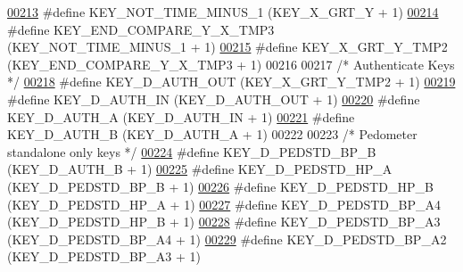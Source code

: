 \begin{DoxyCode}
\hypertarget{dmp_key_8h_source.tex_l00213}{}\hyperlink{dmp_key_8h_ab1bf47800a1876cde2b38ed43380180e}{00213} \textcolor{preprocessor}{#define KEY\_NOT\_TIME\_MINUS\_1        (KEY\_X\_GRT\_Y + 1)}
\hypertarget{dmp_key_8h_source.tex_l00214}{}\hyperlink{dmp_key_8h_a7e19d54f40e69e66c4c6f5d07bd9a3ff}{00214} \textcolor{preprocessor}{#define KEY\_END\_COMPARE\_Y\_X\_TMP3    (KEY\_NOT\_TIME\_MINUS\_1 + 1)}
\hypertarget{dmp_key_8h_source.tex_l00215}{}\hyperlink{dmp_key_8h_a4a328a8ff13b50c160f74d3c2598d329}{00215} \textcolor{preprocessor}{#define KEY\_X\_GRT\_Y\_TMP2            (KEY\_END\_COMPARE\_Y\_X\_TMP3 + 1)}
00216 
00217 \textcolor{comment}{/* Authenticate Keys */}
\hypertarget{dmp_key_8h_source.tex_l00218}{}\hyperlink{dmp_key_8h_a4c29ca8efec08f8a64600e8aa5a32c12}{00218} \textcolor{preprocessor}{#define KEY\_D\_AUTH\_OUT              (KEY\_X\_GRT\_Y\_TMP2 + 1)}
\hypertarget{dmp_key_8h_source.tex_l00219}{}\hyperlink{dmp_key_8h_a59e847b64e33e61f9966b3d983b10b15}{00219} \textcolor{preprocessor}{#define KEY\_D\_AUTH\_IN               (KEY\_D\_AUTH\_OUT + 1)}
\hypertarget{dmp_key_8h_source.tex_l00220}{}\hyperlink{dmp_key_8h_a92d1d618492b7328916f55b8f7abea3c}{00220} \textcolor{preprocessor}{#define KEY\_D\_AUTH\_A                (KEY\_D\_AUTH\_IN + 1)}
\hypertarget{dmp_key_8h_source.tex_l00221}{}\hyperlink{dmp_key_8h_a70e9d248e43cdfa63d3831f7f82f9b93}{00221} \textcolor{preprocessor}{#define KEY\_D\_AUTH\_B                (KEY\_D\_AUTH\_A + 1)}
00222 
00223 \textcolor{comment}{/* Pedometer standalone only keys */}
\hypertarget{dmp_key_8h_source.tex_l00224}{}\hyperlink{dmp_key_8h_a8f8b3b0a8943bd307b1dec4bd72359f8}{00224} \textcolor{preprocessor}{#define KEY\_D\_PEDSTD\_BP\_B           (KEY\_D\_AUTH\_B + 1)}
\hypertarget{dmp_key_8h_source.tex_l00225}{}\hyperlink{dmp_key_8h_ac990aaace317529e60bae4a8d0488b4a}{00225} \textcolor{preprocessor}{#define KEY\_D\_PEDSTD\_HP\_A           (KEY\_D\_PEDSTD\_BP\_B + 1)}
\hypertarget{dmp_key_8h_source.tex_l00226}{}\hyperlink{dmp_key_8h_a984c0056912d9764a95a8688bc411ba4}{00226} \textcolor{preprocessor}{#define KEY\_D\_PEDSTD\_HP\_B           (KEY\_D\_PEDSTD\_HP\_A + 1)}
\hypertarget{dmp_key_8h_source.tex_l00227}{}\hyperlink{dmp_key_8h_a00642103ec420a4ce4e0ecaccb307e3d}{00227} \textcolor{preprocessor}{#define KEY\_D\_PEDSTD\_BP\_A4          (KEY\_D\_PEDSTD\_HP\_B + 1)}
\hypertarget{dmp_key_8h_source.tex_l00228}{}\hyperlink{dmp_key_8h_a3b6016875ac268e46923fb9e7ce7dd2c}{00228} \textcolor{preprocessor}{#define KEY\_D\_PEDSTD\_BP\_A3          (KEY\_D\_PEDSTD\_BP\_A4 + 1)}
\hypertarget{dmp_key_8h_source.tex_l00229}{}\hyperlink{dmp_key_8h_a93b4bfc0f7d08df58f26ee0b0fea8961}{00229} \textcolor{preprocessor}{#define KEY\_D\_PEDSTD\_BP\_A2          (KEY\_D\_PEDSTD\_BP\_A3 + 1)}

\end{DoxyCode}
